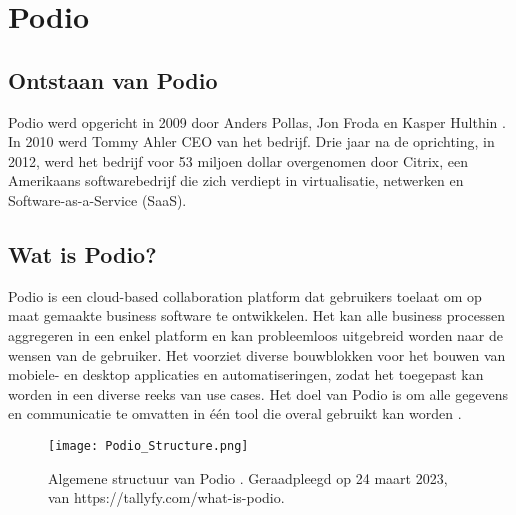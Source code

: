 
\section{Podio}


\subsection{Ontstaan van Podio}

Podio werd opgericht in 2009 door Anders Pollas, Jon Froda en Kasper Hulthin \autocite{Crunchbase}. In 2010 werd Tommy Ahler CEO van het bedrijf. Drie jaar na de oprichting, in 2012, werd het bedrijf voor 53 miljoen dollar overgenomen door Citrix, een Amerikaans softwarebedrijf die zich verdiept in virtualisatie, netwerken en Software-as-a-Service (SaaS). \\

\subsection{Wat is Podio?}

Podio is een cloud-based collaboration platform dat gebruikers toelaat om op maat gemaakte business software te ontwikkelen. Het kan alle business processen aggregeren in een enkel platform en kan probleemloos uitgebreid worden naar de wensen van de gebruiker. Het voorziet diverse bouwblokken voor het bouwen van mobiele- en desktop applicaties en automatiseringen, zodat het toegepast kan worden in een diverse reeks van use cases. Het doel van Podio is om alle gegevens en communicatie te omvatten in één tool die overal gebruikt kan worden \autocite{Podio}. \\ 

\begin{figure}
    \centering
    \texttt{[image: Podio\_Structure.png]}
    \caption{Algemene structuur van Podio \autocite{TallyfyPodio}. Geraadpleegd op 24 maart 2023, van https://tallyfy.com/what-is-podio.}
    \label{fig:podio_structure}
\end{figure}

